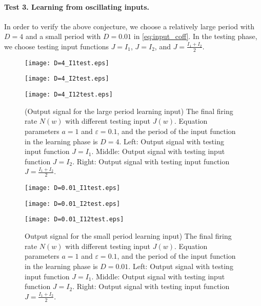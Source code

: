 \paragraph{Test 3. Learning from oscillating inputs.}

In order to verify the above conjecture, we choose a relatively large period with $D=4$ and a small period with $D=0.01$ in \eqref{eq:input_coff}.  In the testing phase, we choose testing input functions $J=I_1$, $J=I_2$, and $J=\frac{I_1+I_2}{2}$.
\begin{figure}[!htb]
    \centering
        \begin{minipage}[c]{0.3\textwidth}
            \centering
            \texttt{[image: D=4\_I1test.eps]}
        \end{minipage}
        \begin{minipage}[c]{0.3\textwidth}
            \centering
            \texttt{[image: D=4\_I2test.eps]}
        \end{minipage}
        \begin{minipage}[c]{0.3\textwidth}
            \centering
            \texttt{[image: D=4\_I12test.eps]}
        \end{minipage}
    \caption{(Output signal for the large period learning input) The
final firing rate $N(w)$ with different testing input $J(w)$. Equation parameters $a=1$ and $\varepsilon=0.1$, and the period of the input function in the learning phase is $D=4$. Left: Output signal with testing input function $J=I_1$. Middle: Output signal with testing input function $J=I_2$. Right: Output signal with testing input function $J=\frac{I_1+I_2}{2}$.}
    \label{fig:largeD}
\end{figure}
\begin{figure}[!htb]
    \centering
        \begin{minipage}[c]{0.3\textwidth}
            \centering
            \texttt{[image: D=0.01\_I1test.eps]}
        \end{minipage}
        \begin{minipage}[c]{0.3\textwidth}
            \centering
            \texttt{[image: D=0.01\_I2test.eps]}
        \end{minipage}
        \begin{minipage}[c]{0.3\textwidth}
            \centering
            \texttt{[image: D=0.01\_I12test.eps]}
        \end{minipage}
    \caption{Output signal for the small period learning input) The
final firing rate $N(w)$ with different testing input $J(w)$. Equation parameters $a=1$ and $\varepsilon=0.1$, and the period of the input function in the learning phase is $D=0.01$. Left: Output signal with testing input function $J=I_1$. Middle: Output signal with testing input function $J=I_2$. Right: Output signal with testing input function $J=\frac{I_1+I_2}{2}$.}
    \label{fig:shortD}
\end{figure}

